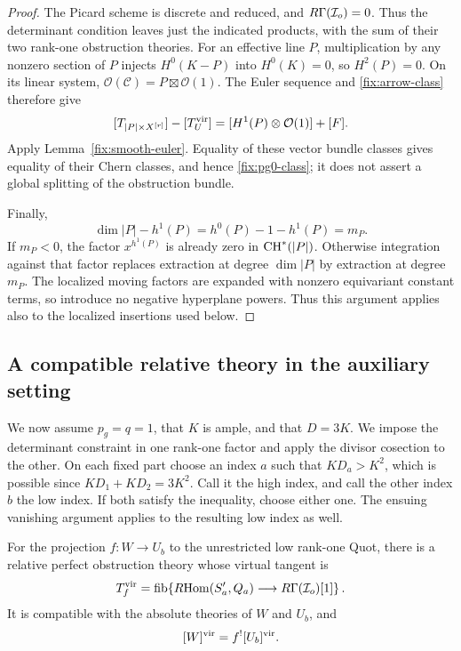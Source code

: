 \begin{proof}
The Picard scheme is discrete and reduced, and
\(R\Gamma(\mathcal I_o)=0\).  Thus the determinant condition
leaves just the indicated products, with the sum of their two
rank-one obstruction theories.  For an effective line \(P\),
multiplication by any nonzero section of \(P\) injects
\(H^0(K-P)\) into \(H^0(K)=0\), so \(H^2(P)=0\).
On its linear system,
\(\mathcal O(\mathcal C)=P\boxtimes\mathcal O(1)\).
The Euler sequence and \eqref{fix:arrow-class} therefore give
\[
 [T_{|P|\times X^{[r]}}]-[T_U^{\mathrm{vir}}]
 = [H^1(P)\otimes\mathcal O(1)]+[F].
\]
Apply Lemma~\ref{fix:smooth-euler}.  Equality of these vector
bundle classes gives equality of their Chern classes, and hence
\eqref{fix:pg0-class}; it does not assert a global splitting of
the obstruction bundle.

Finally,
\[
 \dim|P|-h^1(P)=h^0(P)-1-h^1(P)=m_P.
\]
If \(m_P<0\), the factor \(x^{h^1(P)}\) is already zero in
\(\operatorname{CH}^*(|P|)\).  Otherwise integration against that factor
replaces extraction at degree \(\dim|P|\) by extraction at degree
\(m_P\).  The localized moving factors are expanded with nonzero
equivariant constant terms, so introduce no negative hyperplane
powers.  Thus this argument applies also to the localized
insertions used below.
\end{proof}

\subsection{A compatible relative theory in the auxiliary setting}

We now assume \(p_g=q=1\), that \(K\) is ample, and that \(D=3K\).
We impose the determinant constraint in one rank-one factor and apply
the divisor cosection to the other.
On each fixed part choose an index \(a\) such that
\(KD_a>K^2\), which is possible since
\(KD_1+KD_2=3K^2\).  Call it the high index, and call the other
index \(b\) the low index.  If both satisfy the inequality,
choose either one.  The ensuing vanishing argument applies to
the resulting low index as well.

\begin{lemma}\label{fix:relative-pot}
For the projection \(f:W\to U_b\) to the unrestricted low
rank-one Quot, there is a relative perfect obstruction theory
whose virtual tangent is
\begin{equation}\label{fix:relative-tangent}
 T_f^{\mathrm{vir}}=
 \operatorname{fib}\!\left\{R\!\operatorname{Hom}(S'_a,Q_a)
       \longrightarrow R\Gamma(\mathcal I_o)[1]\right\}.
\end{equation}
It is compatible with the absolute theories of \(W\) and \(U_b\),
and
\begin{equation}\label{fix:relative-class}
 [W]^{\mathrm{vir}}=f^![U_b]^{\mathrm{vir}}.
\end{equation}
\end{lemma}

